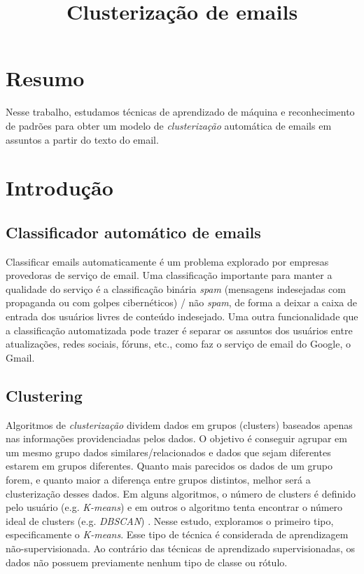 \documentclass[conference]{IEEEtran}
\begin{document}
\title{Clusterização de emails}

\author{
\and
{}
}

\maketitle



\section{Resumo}

Nesse trabalho, estudamos técnicas de aprendizado de máquina e reconhecimento de padrões para obter um modelo de \textit{clusterização} automática de emails em assuntos a partir do texto do email.

\section{Introdução}

\subsection{Classificador automático de emails}

Classificar emails automaticamente é um problema explorado por empresas provedoras de serviço de email. Uma classificação importante para manter a qualidade do serviço é a classificação binária \textit{spam} (mensagens indesejadas com propaganda ou com golpes cibernéticos) / não \textit{spam}\cite{b1}, de forma a deixar a caixa de entrada dos usuários livres de conteúdo indesejado. Uma outra funcionalidade que a classificação automatizada pode trazer é separar os assuntos dos usuários entre atualizações, redes sociais, fóruns, etc., como faz o serviço de email do Google, o Gmail\cite{b2}.

\subsection{Clustering}
Algoritmos de \textit{clusterização} dividem dados em grupos (clusters) baseados apenas nas informações providenciadas pelos dados. O objetivo é conseguir agrupar em um mesmo grupo dados similares/relacionados e dados que sejam diferentes estarem em grupos diferentes. Quanto mais parecidos os dados de um grupo forem, e quanto maior a diferença entre grupos distintos, melhor será a clusterização desses dados. Em alguns algoritmos, o número de clusters é definido pelo usuário (e.g. \textit{K-means}) e em outros o algoritmo tenta encontrar o número ideal de clusters (e.g. \textit{DBSCAN}) \cite{b3}. Nesse estudo, exploramos o primeiro tipo, especificamente o \textit{K-means}. Esse tipo de técnica é considerada de aprendizagem não-supervisionada. Ao contrário das técnicas de aprendizado supervisionadas, os dados não possuem previamente nenhum tipo de classe ou rótulo.
\end{document}
